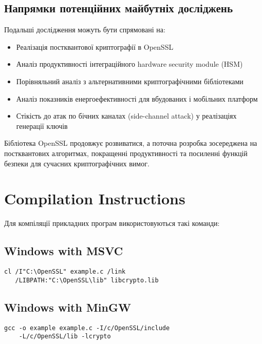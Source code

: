 \subsection{Напрямки потенційних майбутніх досліджень}

Подальші дослідження можуть бути спрямовані на:
\begin{itemize}
    \item Реалізація постквантової криптографії в OpenSSL
    \item Аналіз продуктивності інтеграційного hardware security module (HSM)
    \item Порівняльний аналіз з альтернативними криптографічними бібліотеками
    \item Аналіз показників енергоефективності для вбудованих і мобільних платформ
    \item Стікість до атак по бічних каналах (side-channel attack) у реалізаціях генерації ключів
\end{itemize}

Бібліотека OpenSSL продовжує розвиватися, а поточна розробка зосереджена на постквантових алгоритмах, покращенні 
продуктивності та посиленні функцій безпеки для сучасних криптографічних вимог.

\newpage
{}
\printbibliography

\newpage
\appendix

\section{Compilation Instructions}

Для компіляції прикладних програм використовуються такі команди:

\subsection{Windows with MSVC}
\begin{verbatim}
cl /I"C:\OpenSSL" example.c /link 
   /LIBPATH:"C:\OpenSSL\lib" libcrypto.lib
\end{verbatim}

\subsection{Windows with MinGW}
\begin{verbatim}
gcc -o example example.c -I/c/OpenSSL/include 
    -L/c/OpenSSL/lib -lcrypto
\end{verbatim}

